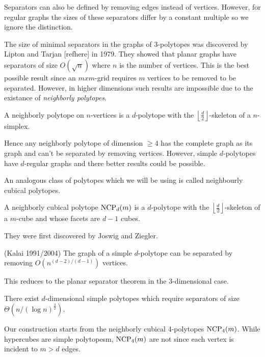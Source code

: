 Separators can also be defined by removing edges instead of vertices. However, 
for regular graphs the sizes of these separators differ by a constant multiple 
so we ignore the distinction.

The size of minimal separators in the graphs of 3-polytopes was discovered by 
Lipton and Tarjan [refhere] in 1979. They showed that planar graphs have 
separators of size $O(\sqrt{n})$ where $n$ is the number of vertices. This is 
the best possible result since an $mxm$-grid requires $m$ vertices to be 
removed to be separated. However, in higher dimensions such results are 
impossible due to the existance of \textit{neighborly polytopes}.

\begin{definition}
 A neighborly polytope on $n$-vertices is a $d$-polytope with the $\left\lfloor 
\frac{d}{2} \right\rfloor$-skeleton of a $n$-simplex.
\end{definition}

Hence any neighborly polytope of dimension $\geq 4$ has the complete graph as 
its graph and can't be separated by removing vertices. However, simple 
$d$-polytopes have $d$-regular graphs and there better results could be 
possible. 

An analogous class of polytopes which we will be using is called neighbourly 
cubical polytopes. 

\begin{definition}
 A neighborly cubical polytope $\textrm{NCP}_d(m)$ is a $d$-polytope with the 
$\left\lfloor \frac{d}{2} 
\right\rfloor$-skeleton of a $m$-cube and whose facets are $d-1$ cubes.
\end{definition}

They were first discovered by Joswig and Ziegler.

\begin{conjecture}
 (Kalai 1991/2004) The graph of a simple $d$-polytope can be separated by 
removing $O(n^{(d-2)/(d-1)})$ vertices. 
\end{conjecture}

This reduces to the planar separator theorem in the 3-dimensional case. 

\begin{theorem}
 There exist $d$-dimensional simple polytopes which require separators of size 
$\Theta(n/(\log n)^{\frac{3}{2}})$.
\end{theorem}

Our construction starts from the neighborly cubical 4-polytopes $\textrm{NCP}_4(m)$. 
While hypercubes are simple polytopesm, $\textrm{NCP}_4(m)$ are not since each vertex is 
incident to $m>d$ edges. 

